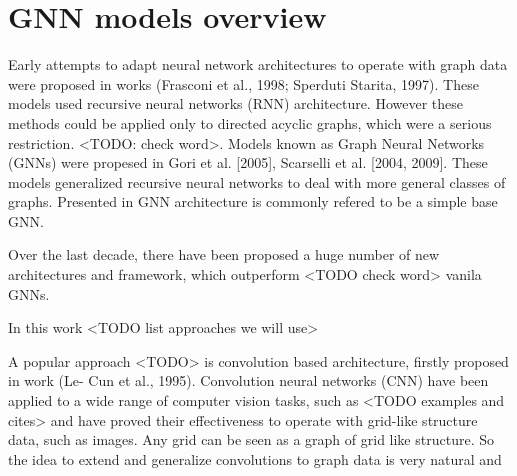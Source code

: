 \section{GNN models overview}
\label{sec:models}





Early attempts to adapt neural network architectures to operate with graph data 
were proposed in works (Frasconi et al., 1998; Sperduti  Starita, 1997). These models 
used recursive neural networks (RNN) architecture. However these methods could be applied
only to directed acyclic graphs, which were a serious restriction. <TODO: check word>.
Models known as Graph Neural Networks (GNNs) were propesed in  Gori et al. [2005], Scarselli et al. [2004, 2009].
These models generalized recursive neural networks to deal with more general classes of graphs.
Presented in \cite{GNN} GNN architecture is commonly refered to be a simple base GNN.



Over the last decade, there have been proposed a huge number of new architectures and framework, which 
outperform <TODO check word> vanila GNNs. 



In this work <TODO list approaches we will use>



A popular approach <TODO> is convolution based architecture, firstly proposed in work (Le-
Cun et al., 1995).
Convolution neural networks (CNN) have been applied to a wide range of computer
vision tasks, such as <TODO examples and cites> and have proved their effectiveness
to operate with grid-like structure data, such as images.
Any grid can be seen as a graph of grid like structure. So the idea to extend and generalize
convolutions to graph data is very natural and %


